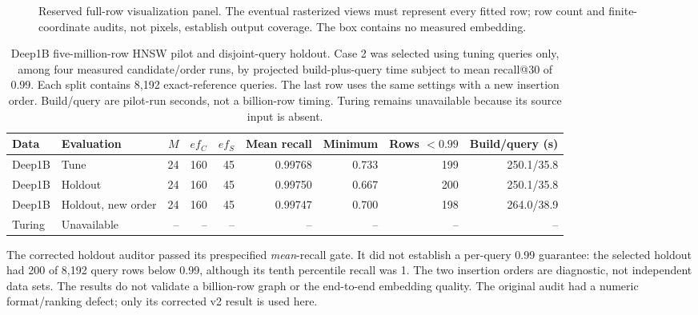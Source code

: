 \documentclass[article]{jss}
\begin{document}
\begin{figure}[htbp]
\centering
{}
\caption{Reserved full-row visualization panel. The eventual rasterized
  views must represent every fitted row; row count and finite-coordinate
  audits, not pixels, establish output coverage. The box contains no
  measured embedding.}
\label{fig:pending-deep-layouts}
\end{figure}

\begin{table}[htbp]
\centering
\scriptsize
\caption{Deep1B five-million-row HNSW pilot and disjoint-query holdout.
  Case 2 was selected using tuning queries only, among four measured
  candidate/order runs, by projected build-plus-query time subject to
  mean recall@30 of 0.99. Each split contains 8,192 exact-reference
  queries. The last row uses the same settings with a new insertion order.
  Build/query are pilot-run seconds, not a billion-row timing. Turing
  remains unavailable because its source input is absent.}
\label{tab:pending-hnsw}
\begin{tabular}{llrrrrrrr}
\toprule
Data & Evaluation & $M$ & $ef_C$ & $ef_S$ & Mean recall &
  Minimum & Rows $<0.99$ & Build/query (s) \\
\midrule
Deep1B & Tune & 24 & 160 & 45 & 0.99768 & 0.733 & 199 & 250.1/35.8 \\
Deep1B & Holdout & 24 & 160 & 45 & 0.99750 & 0.667 & 200 & 250.1/35.8 \\
Deep1B & Holdout, new order & 24 & 160 & 45 & 0.99747 & 0.700 & 198 & 264.0/38.9 \\
Turing & Unavailable & -- & -- & -- & -- & -- & -- & -- \\
\bottomrule
\end{tabular}
\end{table}

The corrected holdout auditor passed its prespecified \emph{mean}-recall
gate. It did not establish a per-query 0.99 guarantee: the selected
holdout had 200 of 8,192 query rows below 0.99, although its tenth
percentile recall was 1. The two insertion orders are diagnostic, not
independent data sets. The results do not validate a billion-row graph
or the end-to-end embedding quality. The original audit had a numeric
format/ranking defect; only its corrected v2 result is used here.
\end{document}
